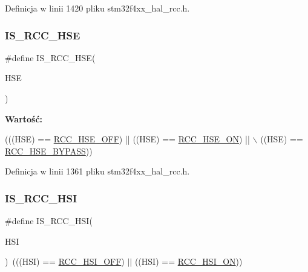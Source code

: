 Definicja w linii 1420 pliku stm32f4xx\+\_\+hal\+\_\+rcc.\+h.

\mbox{\label{group___r_c_c___i_s___r_c_c___definitions_ga287bbcafd73d07ec915c2f793301908a}} 
\subsubsection{\texorpdfstring{I\+S\+\_\+\+R\+C\+C\+\_\+\+H\+SE}{IS\_RCC\_HSE}}
{\footnotesize\ttfamily \#define I\+S\+\_\+\+R\+C\+C\+\_\+\+H\+SE(\begin{DoxyParamCaption}\item[{}]{H\+SE }\end{DoxyParamCaption})}

{\bfseries Wartość\+:}
\begin{DoxyCode}
(((HSE) == \hyperlink{group___r_c_c___h_s_e___config_ga1616626d23fbce440398578855df6f97}{RCC\_HSE\_OFF}) || ((HSE) == \hyperlink{group___r_c_c___h_s_e___config_gabc4f70a44776c557af20496b04d9a9db}{RCC\_HSE\_ON}) || \(\backslash\)
                         ((HSE) == \hyperlink{group___r_c_c___h_s_e___config_ga5ca515db2d5c4d5bdb9ee3d154df2704}{RCC\_HSE\_BYPASS}))
\end{DoxyCode}


Definicja w linii 1361 pliku stm32f4xx\+\_\+hal\+\_\+rcc.\+h.

\mbox{\label{group___r_c_c___i_s___r_c_c___definitions_ga9d2bad5b4ad9ba8fb224ddbd949c27d6}} 
\subsubsection{\texorpdfstring{I\+S\+\_\+\+R\+C\+C\+\_\+\+H\+SI}{IS\_RCC\_HSI}}
{\footnotesize\ttfamily \#define I\+S\+\_\+\+R\+C\+C\+\_\+\+H\+SI(\begin{DoxyParamCaption}\item[{}]{H\+SI }\end{DoxyParamCaption})~(((H\+SI) == \hyperlink{group___r_c_c___h_s_i___config_ga1b34d37d3b51afec0758b3ddc7a7e665}{R\+C\+C\+\_\+\+H\+S\+I\+\_\+\+O\+FF}) $\vert$$\vert$ ((H\+SI) == \hyperlink{group___r_c_c___h_s_i___config_ga0bf09ef9e46d5da25cced7b3122f92f5}{R\+C\+C\+\_\+\+H\+S\+I\+\_\+\+ON}))}



